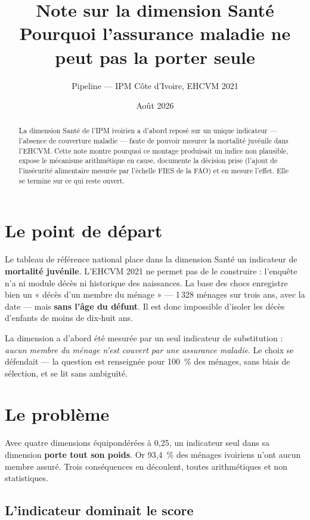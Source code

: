 \documentclass[11pt,a4paper]{article}
\title{\bfseries Note sur la dimension Santé\\[4pt]
\large Pourquoi l'assurance maladie ne peut pas la porter seule}
\author{Pipeline \col{PythonIPM} --- IPM Côte d'Ivoire, EHCVM 2021}
\date{Août 2026}
\begin{document}
\maketitle

\begin{abstract}
\noindent La dimension Santé de l'IPM ivoirien a d'abord reposé sur un unique indicateur ---
l'absence de couverture maladie --- faute de pouvoir mesurer la mortalité juvénile dans l'EHCVM.
Cette note montre pourquoi ce montage produisait un indice non plausible, expose le mécanisme
arithmétique en cause, documente la décision prise (l'ajout de l'insécurité alimentaire mesurée
par l'échelle FIES de la FAO) et en mesure l'effet. Elle se termine sur ce qui reste ouvert.
\end{abstract}

\section{Le point de départ}

Le tableau de référence national place dans la dimension Santé un indicateur de \textbf{mortalité
juvénile}. L'EHCVM 2021 ne permet pas de le construire : l'enquête n'a ni module décès ni
historique des naissances. La base des chocs enregistre bien un « décès d'un membre du ménage »
--- 1\,328 ménages sur trois ans, avec la date --- mais \textbf{sans l'âge du défunt}. Il est donc
impossible d'isoler les décès d'enfants de moins de dix-huit ans.

La dimension a d'abord été mesurée par un seul indicateur de substitution : \emph{aucun membre du
ménage n'est couvert par une assurance maladie}. Le choix se défendait --- la question est
renseignée pour 100~\% des ménages, sans biais de sélection, et se lit sans ambiguïté.

\section{Le problème}

Avec quatre dimensions équipondérées à 0,25, un indicateur seul dans sa dimension \textbf{porte
tout son poids}. Or 93,4~\% des ménages ivoiriens n'ont aucun membre assuré. Trois conséquences
en découlent, toutes arithmétiques et non statistiques.

\subsection{L'indicateur dominait le score}
\end{document}

